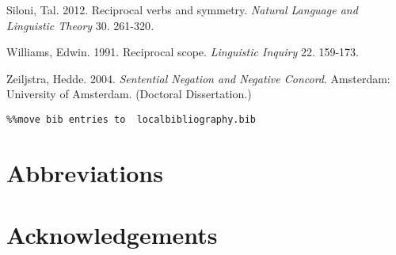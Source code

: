 \documentclass[output=paper]{langsci/langscibook}
\begin{document}
Siloni, Tal. 2012. Reciprocal verbs and symmetry. \emph{Natural Language and Linguistic Theory} 30. 261-320\emph{.}

Williams, Edwin. 1991. Reciprocal scope. \textit{Linguistic Inquiry} 22. 159-173.

Zeiljstra, Hedde. 2004. \textit{Sentential Negation and Negative Concord}. Amsterdam: University of Amsterdam. (Doctoral Dissertation.)


\begin{verbatim}%%move bib entries to  localbibliography.bib
\end{verbatim}

\section*{Abbreviations}
\section*{Acknowledgements}

\printbibliography[heading=subbibliography,notkeyword=this]
\end{document}
